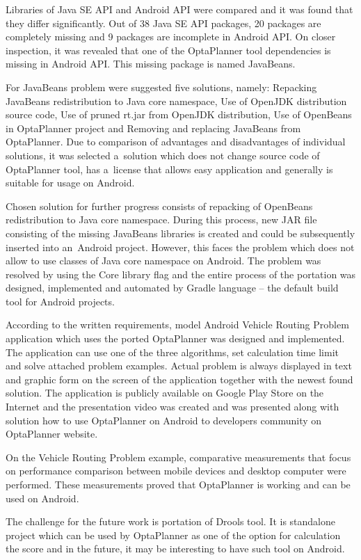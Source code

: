 Libraries of Java SE API and Android API were compared and it was found that they differ significantly. Out of 38 Java
SE API packages, 20 packages are completely missing and 9 packages are incomplete in Android API. On closer inspection,
it was revealed that one of the OptaPlanner tool dependencies is missing in Android API. This missing package is named
JavaBeans.

For JavaBeans problem were suggested five solutions, namely: Repacking JavaBeans redistribution to Java core namespace,
Use of OpenJDK distribution source code, Use of pruned rt.jar from OpenJDK distribution, Use of OpenBeans in
OptaPlanner project and Removing and replacing JavaBeans from OptaPlanner. Due to comparison of advantages and
disadvantages of individual solutions, it was selected a~solution which does not change source code of OptaPlanner tool,
has a~license that allows easy application and generally is suitable for usage on Android.

Chosen solution for further progress consists of repacking of OpenBeans redistribution to Java core namespace. During
this process, new JAR file consisting of the missing JavaBeans libraries is created and could be subsequently inserted
into an~Android project. However, this faces the problem which does not allow to use classes of Java core namespace on
Android. The problem was resolved by using the Core library flag and the entire process of the portation was designed,
implemented and automated by Gradle language -- the default build tool for Android projects.

According to the written requirements, model Android Vehicle Routing Problem application which uses the ported
OptaPlanner was designed and implemented. The application can use one of the three algorithms, set calculation time
limit and solve attached problem examples. Actual problem is always displayed in text and graphic form on the screen of
the application together with the newest found solution. The application is publicly available on Google Play Store on
the Internet and the presentation video was created and was presented along with solution how to use OptaPlanner on
Android to developers community on OptaPlanner website.

On the Vehicle Routing Problem example, comparative measurements that focus on performance comparison between mobile
devices and desktop computer were performed. These measurements proved that OptaPlanner is working and can be used on
Android.

The challenge for the future work is portation of Drools tool. It is standalone project which can be used by OptaPlanner
as one of the option for calculation the score and in the future, it may be interesting to have such tool on Android.
